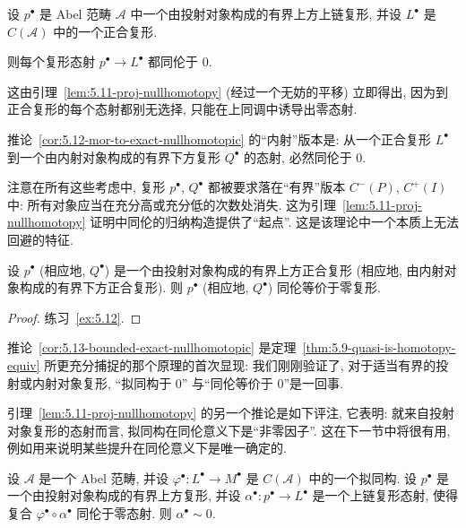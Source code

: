 \begin{corollary}\label{cor:5.12-mor-to-exact-nullhomotopic}
设 $p^\bullet$ 是 Abel 范畴 $\mathcal{A}$ 中一个由投射对象构成的有界上方上链复形, 并设 $L^\bullet$ 是 $C(\mathcal{A})$ 中的一个正合复形.

则每个复形态射 $p^\bullet\to L^\bullet$ 都同伦于 $0$.
\end{corollary}

\indent 这由引理~\ref{lem:5.11-proj-nullhomotopy} (经过一个无妨的平移) 立即得出, 因为到正合复形的每个态射都别无选择, 只能在上同调中诱导出零态射.

\indent 推论~\ref{cor:5.12-mor-to-exact-nullhomotopic} 的``内射''版本是: 从一个正合复形 $L^\bullet$ 到一个由内射对象构成的有界下方复形 $Q^\bullet$ 的态射, 必然同伦于 $0$.

\indent 注意在所有这些考虑中, 复形 $p^\bullet$, $Q^\bullet$ 都被要求落在``有界''版本 $C^-(P)$, $C^+(I)$ 中: 所有对象应当在充分高或充分低的次数处消失. 这为引理~\ref{lem:5.11-proj-nullhomotopy} 证明中同伦的归纳构造提供了``起点''. 这是该理论中一个本质上无法回避的特征.

\begin{corollary}\label{cor:5.13-bounded-exact-nullhomotopic}
设 $p^\bullet$ (相应地, $Q^\bullet$) 是一个由投射对象构成的有界上方正合复形 (相应地, 由内射对象构成的有界下方正合复形). 则 $p^\bullet$ (相应地, $Q^\bullet$) 同伦等价于零复形.
\end{corollary}

\begin{proof}
练习~\ref{ex:5.12}.
\end{proof}

\indent 推论~\ref{cor:5.13-bounded-exact-nullhomotopic} 是定理~\ref{thm:5.9-quasi-is-homotopy-equiv} 所更充分捕捉的那个原理的首次显现: 我们刚刚验证了, 对于适当有界的投射或内射对象复形, ``拟同构于 $0$'' 与``同伦等价于 $0$''是一回事.

\indent 引理~\ref{lem:5.11-proj-nullhomotopy} 的另一个推论是如下评注, 它表明: 就来自投射对象复形的态射而言, 拟同构在同伦意义下是``非零因子''. 这在下一节中将很有用, 例如用来说明某些提升在同伦意义下是唯一确定的.

\begin{lemma}\label{lem:5.14-nonzero-divisor}
设 $\mathcal{A}$ 是一个 Abel 范畴, 并设 $\varphi^\bullet:L^\bullet\to M^\bullet$ 是 $C(\mathcal{A})$ 中的一个拟同构. 设 $p^\bullet$ 是一个由投射对象构成的有界上方复形, 并设 $\alpha^\bullet:p^\bullet\to L^\bullet$ 是一个上链复形态射, 使得复合 $\varphi^\bullet\circ\alpha^\bullet$ 同伦于零态射. 则 $\alpha^\bullet\sim 0$.
\end{lemma}

